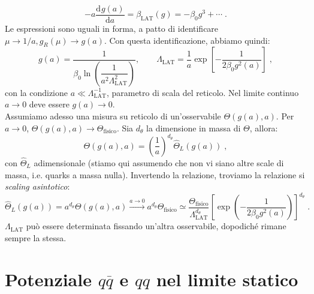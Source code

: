 \documentclass[12pt,a4paper]{article}
\theoremstyle{definition}
\newcommand{\dev}[3][]{\frac{\mathrm{d}^{#1} #2}{\mathrm{d} #3^{#1}}}
\numberwithin{equation}{section}
\begin{document}
$$
-a\dev{g(a)}{a}=\beta_{\mathrm{LAT}}(g)=-\beta_0g^3+\cdots\;.
$$
Le espressioni sono uguali in forma, a patto di identificare $\mu\to 1/a,g_R(\mu)\to g(a)$. Con questa identificazione, abbiamo quindi:
\begin{equation}
g(a)=\frac{1}{\beta_0\ln\left(\dfrac{1}{a^2\Lambda_{\mathrm{LAT}}^2}\right)},\qquad \Lambda_{\mathrm{LAT}}=\frac{1}{a}\exp\left[-\frac{1}{2\beta_0g^2(a)}\right]\;,
\end{equation}
con la condizione $a\ll \Lambda_{\mathrm{LAT}}^{-1}$, parametro di scala del reticolo. Nel limite continuo $a\to 0$ deve essere $g(a)\to 0$. \\
Assumiamo adesso una misura su reticolo di un'osservabile $\Theta(g(a),a)$. Per $a\to 0$, $\Theta(g(a),a)\to \Theta_{\mathrm{fisico}}$. Sia $d_{\theta}$ la dimensione in massa di $\Theta$, allora:
\begin{equation}
\Theta(g(a),a)=\left(\frac{1}{a}\right)^{d_{\theta}}\hat{\Theta}_L(g(a))\;,
\end{equation}
con $\hat{\Theta}_L$ adimensionale (stiamo qui assumendo che non vi siano altre scale di massa, i.e. quarks a massa nulla). Invertendo la relazione, troviamo la relazione si \emph{scaling asintotico}:
\begin{equation}
\hat{\Theta}_L(g(a))=a^{d_{\theta}}\Theta(g(a),a)\stackrel{a\to 0}{\longrightarrow} a^{d_{\theta}}\Theta_{\mathrm{fisico}}\simeq \frac{\Theta_{\mathrm{fisico}}}{\Lambda_{\mathrm{LAT}}^{d_{\theta}}}\left[\exp\left(-\frac{1}{2\beta_0g^2(a)}\right)\right]^{d_{\theta}}\;.
\end{equation}
$\Lambda_{\mathrm{LAT}}$ può essere determinata fissando un'altra osservabile, dopodiché rimane sempre la stessa.
\cleardoublepage
\section{Potenziale $q\overline{q}$ e $qq$ nel limite statico}
\end{document}
